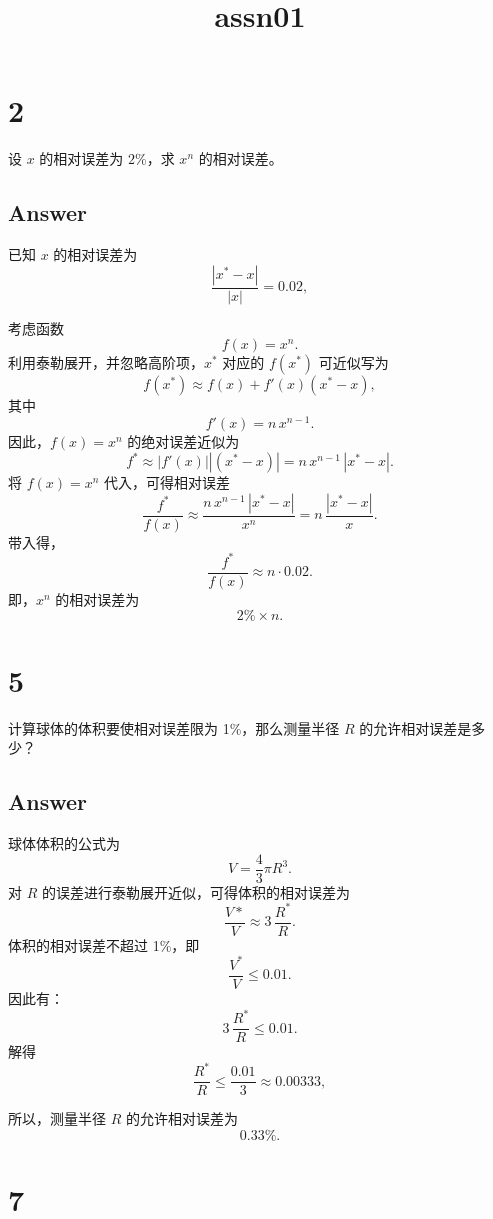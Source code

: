 \documentclass[11pt]{article}
\title{assn01}
\begin{document}
    
    \maketitle
    
    

    
    \section{2}\label{section}

设 \(x\) 的相对误差为 \(2\%\)，求 \(x^n\) 的相对误差。

\subsection{Answer}\label{answer}

已知 \(x\) 的相对误差为 \[
\frac{|x^*-x|}{|x|}=0.02,
\]

考虑函数 \[
f(x)=x^n.
\] 利用泰勒展开，并忽略高阶项，\(x^*\) 对应的 \(f(x^*)\) 可近似写为 \[
f(x^*)\approx f(x)+f'(x)(x^*-x),
\] 其中 \[
f'(x)=n\,x^{n-1}.
\] 因此，\(f(x)=x^n\) 的绝对误差近似为 \[
f^* \approx |f'(x)||(x^*-x)| = n\,x^{n-1}\,|x^*-x|.
\] 将 \(f(x)=x^n\) 代入，可得相对误差 \[
\frac{f^*}{f(x)} \approx \frac{n\,x^{n-1}\,|x^*-x|}{x^n}
=n\,\frac{|x^*-x|}{x}.
\] 带入得， \[
\frac{f^*}{f(x)}\approx n\cdot 0.02.
\] 即，\(x^n\) 的相对误差为 \[
\boxed{2\% \times n.}
\]

    \section{5}\label{section}

计算球体的体积要使相对误差限为 1\%，那么测量半径 \(R\)
的允许相对误差是多少？

\subsection{Answer}\label{answer}

球体体积的公式为 \[
V=\frac{4}{3}\pi R^3.
\] 对 \(R\) 的误差进行泰勒展开近似，可得体积的相对误差为 \[
\frac{V*}{V}\approx 3\,\frac{R^*}{R}.
\] 体积的相对误差不超过 1\%，即 \[
\frac{V^*}{V}\le 0.01.
\] 因此有： \[
3\,\frac{R^*}{R}\le 0.01.
\] 解得 \[
\frac{R^*}{R}\le \frac{0.01}{3}\approx 0.00333,
\]

所以，测量半径 \(R\) 的允许相对误差为 \[
\boxed{0.33\%.}
\]

    \section{7}\label{section}
\end{document}
